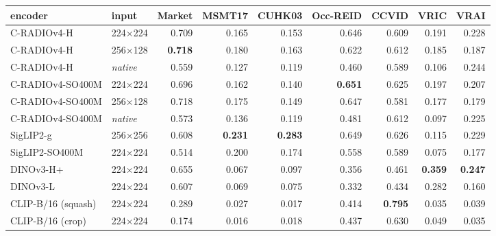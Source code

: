 \begin{tabular}{llrrrrrrr}
\toprule
encoder & input & Market & MSMT17 & CUHK03 & Occ-REID & CCVID & VRIC & VRAI \\
\midrule
C-RADIOv4-H & 224$\times$224 & 0.709 & 0.165 & 0.153 & 0.646 & 0.609 & 0.191 & 0.228 \\
C-RADIOv4-H & 256$\times$128 & \textbf{0.718} & 0.180 & 0.163 & 0.622 & 0.612 & 0.185 & 0.187 \\
C-RADIOv4-H & \textit{native} & 0.559 & 0.127 & 0.119 & 0.460 & 0.589 & 0.106 & 0.244 \\
C-RADIOv4-SO400M & 224$\times$224 & 0.696 & 0.162 & 0.140 & \textbf{0.651} & 0.625 & 0.197 & 0.207 \\
C-RADIOv4-SO400M & 256$\times$128 & 0.718 & 0.175 & 0.149 & 0.647 & 0.581 & 0.177 & 0.179 \\
C-RADIOv4-SO400M & \textit{native} & 0.573 & 0.136 & 0.119 & 0.481 & 0.612 & 0.097 & 0.225 \\
SigLIP2-g & 256$\times$256 & 0.608 & \textbf{0.231} & \textbf{0.283} & 0.649 & 0.626 & 0.115 & 0.229 \\
SigLIP2-SO400M & 224$\times$224 & 0.514 & 0.200 & 0.174 & 0.558 & 0.589 & 0.075 & 0.177 \\
DINOv3-H+ & 224$\times$224 & 0.655 & 0.067 & 0.097 & 0.356 & 0.461 & \textbf{0.359} & \textbf{0.247} \\
DINOv3-L & 224$\times$224 & 0.607 & 0.069 & 0.075 & 0.332 & 0.434 & 0.282 & 0.160 \\
CLIP-B/16 (squash) & 224$\times$224 & 0.289 & 0.027 & 0.017 & 0.414 & \textbf{0.795} & 0.035 & 0.039 \\
CLIP-B/16 (crop) & 224$\times$224 & 0.174 & 0.016 & 0.018 & 0.437 & 0.630 & 0.049 & 0.035 \\
\bottomrule
\end{tabular}
